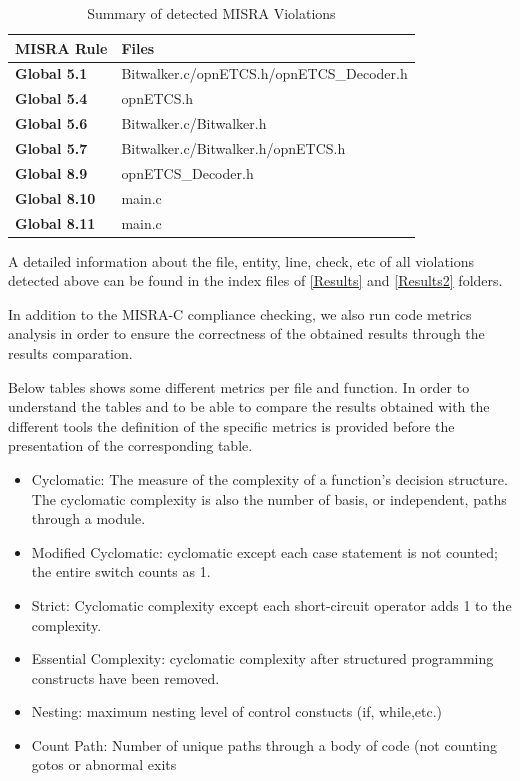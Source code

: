 {\footnotesize\sffamily\centering
  \begin{longtable}{||p{}|p{}||}
  \caption{Summary of detected MISRA Violations}\\
    \hline\hline
    \textbf{MISRA Rule} & \textbf{Files} \\
    \hline\hline
    \endhead
    \hline\hline
    \endfoot
    \textbf{Global 5.1}
& Bitwalker.c/opnETCS.h/opnETCS\_Decoder.h
    \\
    \hline
    \textbf{Global 5.4}
& opnETCS.h
    \\
    \hline
    \textbf{Global 5.6}
& Bitwalker.c/Bitwalker.h
    \\
    \hline
    \textbf{Global 5.7}
& Bitwalker.c/Bitwalker.h/opnETCS.h
    \\
    \hline
    \textbf{Global 8.9}
& opnETCS\_Decoder.h
    \\
    \hline
    \textbf{Global 8.10}
& main.c
    \\
    \hline
    \textbf{Global 8.11}
& main.c
    \\
    \hline
\end{longtable}}

A detailed information about the file, entity, line, check, etc of all violations detected above can be found in the index files of \href{https://github.com/openETCS/validation/blob/master/VnVUserStories/VnVUserStorySQS/04-Results/results}{[Results]} and \href{https://github.com/openETCS/validation/blob/master/VnVUserStories/VnVUserStorySQS/04-Results/results2}{[Results2]} folders.

In addition to the MISRA-C compliance checking, we also run code metrics analysis in order to ensure the correctness of the obtained results through the results comparation.

Below tables shows some different metrics per file and function.
In order to understand the tables and to be able to compare the results obtained with the different tools the definition of the specific metrics is provided before the presentation of the corresponding table.
\begin{itemize}
\item Cyclomatic: The measure of the complexity of a function's decision structure. The cyclomatic complexity is also the number of basis, or independent, paths through a module. 
\item Modified Cyclomatic: cyclomatic except each case statement is not counted; the entire switch counts as 1.
\item Strict: Cyclomatic complexity except each short-circuit operator adds 1 to the complexity.
\item Essential Complexity: cyclomatic complexity after structured programming constructs have been removed.
\item Nesting: maximum nesting level of control constucts (if, while,etc.)
\item Count Path: Number of unique paths through a body of code (not counting gotos or abnormal exits
\end{itemize}


